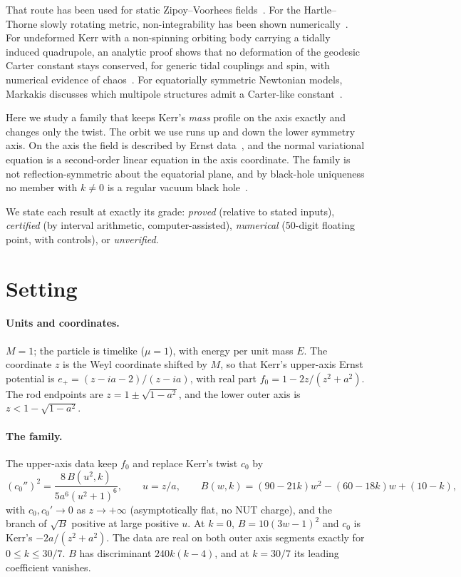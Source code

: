 \documentclass[11pt,a4paper]{article}
\begin{document}
That route has been used for static Zipoy--Voorhees fields~\cite{MPS2013}. For the Hartle--Thorne slowly
rotating metric, non-integrability has been shown numerically~\cite{DestounisKokkotas2023}. For undeformed Kerr with a non-spinning orbiting body carrying a tidally induced quadrupole, an analytic proof
shows that no deformation of the geodesic Carter constant stays conserved, for generic tidal couplings and spin,
with numerical evidence of chaos~\cite{Ramond2026}. For equatorially symmetric Newtonian models, Markakis
discusses which multipole structures admit a Carter-like constant~\cite{Markakis2014}.

Here we study a family that keeps Kerr's \emph{mass} profile on the axis exactly and changes only the twist. The
orbit we use runs up and down the lower symmetry axis. On the axis the field is described by Ernst
data~\cite{Ernst1968}, and the normal variational equation is a second-order linear equation in the axis
coordinate. The family is not reflection-symmetric about the equatorial plane, and by black-hole uniqueness no
member with $k\neq0$ is a regular vacuum black hole~\cite{ChruscielCosta2008}.

We state each result at exactly its grade: \emph{proved} (relative to stated inputs), \emph{certified} (by interval
arithmetic, computer-assisted), \emph{numerical} (50-digit floating point, with controls), or \emph{unverified}.

\section{Setting}
\paragraph{Units and coordinates.} $M=1$; the particle is timelike ($\mu=1$), with energy per unit mass $E$. The
coordinate $z$ is the Weyl coordinate shifted by $M$, so that Kerr's upper-axis Ernst potential is
$e_+=(z-ia-2)/(z-ia)$, with real part $f_0=1-2z/(z^2+a^2)$. The rod endpoints are $z=1\pm\sqrt{1-a^2}$, and the
lower outer axis is $z<1-\sqrt{1-a^2}$.

\paragraph{The family.} The upper-axis data keep $f_0$ and replace Kerr's twist $c_0$ by
\begin{equation}
(c_0'')^2=\frac{8\,B(u^2,k)}{5a^6(u^2+1)^6},\qquad u=z/a,\qquad B(w,k)=(90-21k)w^2-(60-18k)w+(10-k),
\end{equation}
with $c_0,c_0'\to0$ as $z\to+\infty$ (asymptotically flat, no NUT charge), and the branch of $\sqrt B$ positive at
large positive $u$. At $k=0$, $B=10(3w-1)^2$ and $c_0$ is Kerr's $-2a/(z^2+a^2)$. The data are real on both outer
axis segments exactly for $0\le k\le 30/7$. $B$ has discriminant $240k(k-4)$, and at $k=30/7$ its leading
coefficient vanishes.
\end{document}
